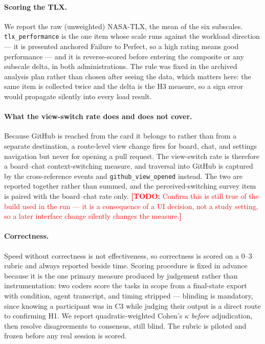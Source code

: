 \documentclass[acmsmall,review,screen]{acmart}
\newcommand{\todo}[1]{\textcolor{red}{\textbf{[TODO:} #1\textbf{]}}}
\newcommand{\code}[1]{\texttt{#1}}
\begin{document}
\paragraph{Scoring the TLX.} We report the raw (unweighted) NASA-TLX, the mean of
the six subscales. \code{tlx\_performance} is the one item whose scale runs
against the workload direction --- it is presented anchored Failure to Perfect,
so a high rating means good performance --- and it is reverse-scored before
entering the composite or any subscale delta, in both administrations. The rule
was fixed in the archived analysis plan rather than chosen after seeing the data,
which matters here: the same item is collected twice and the delta is the H3
measure, so a sign error would propagate silently into every load result.

\paragraph{What the view-switch rate does and does not cover.} Because GitHub is
reached from the card it belongs to rather than from a separate destination, a
route-level view change fires for board, chat, and settings navigation but never
for opening a pull request. The view-switch rate is therefore a board--chat
context-switching measure, and traversal into GitHub is captured by the
cross-reference events and \code{github\_view\_opened} instead. The two are
reported together rather than summed, and the perceived-switching survey item is
paired with the board--chat rate only. \todo{Confirm this is still true of the
build used in the run --- it is a consequence of a UI decision, not a study
setting, so a later interface change silently changes the measure.}

\paragraph{Correctness.} Speed without correctness is not effectiveness, so
correctness is scored on a 0--3 rubric and always reported beside
time. Scoring procedure is fixed in advance because it is the one primary
measure produced by judgement rather than instrumentation: two coders score the
tasks in scope from a final-state export with condition, agent transcript, and timing
stripped --- blinding is mandatory, since knowing a participant was in C3 while
judging their output is a direct route to confirming H1. We report
quadratic-weighted Cohen's $\kappa$ \emph{before} adjudication, then resolve
disagreements to consensus, still blind. The rubric is piloted and frozen before
any real session is scored.
\end{document}
